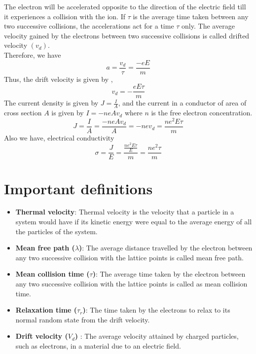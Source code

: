 \documentclass[15pt]{article}
\begin{document}
The electron will be accelerated opposite to the direction of the electric field till it experiences a collision with the ion. If $\tau$ is the average time taken between any two successive collisions, the accelerations act for a time $\tau$ only.
\newpage
The average velocity gained by the electrons between two successive collisions is called drifted velocity $(v_{d})$.
\\
Therefore, we have \begin{equation*}
    a = \frac{v_{d}}{\tau} = \frac{-eE}{m}
\end{equation*}
Thus, the drift velocity is given by ,
\begin{equation}
    v_{d} = -\frac{eE\tau}{m}
\end{equation}
The current density is given by $J = \frac{I}{A}$, and the current in a conductor of area of cross section $A$ is given by $I = -neAv_{d}$ where $n$ is the free electron concentration.
\begin{equation*}
    J =\frac{I}{A} = \frac{-neAv_{d}}{A} = -nev_{d} = \frac{ne^{2}E\tau}{m}
\end{equation*}
Also we have, electrical conductivity
\begin{equation}
    \sigma = \frac{J}{E} = \frac{\frac{ne^{2}E\tau}{E}}{m} = \frac{ne^{2}\tau}{m}
\end{equation}

\section*{Important definitions}

    \begin{itemize}
        \item \textbf{Thermal velocity}: Thermal velocity is the velocity that a particle in a system would have if its kinetic energy were equal to the average energy of all the particles of the system.
        \item \textbf{Mean free path ($\lambda$)}: The average distance travelled by the electron between any two successive collision with the lattice points is called mean free path.
        \item \textbf{Mean collision time ($\tau$)}: The average time taken by the electron between any two  successive collision with the lattice points is called as mean collision time.
        \item \textbf{Relaxation time ($\tau_{r}$)}: The time taken by the electrons to relax to its normal random state from the drift velocity. 
        \item \textbf{Drift velocity ($V_{d}$)} : The average velocity attained by charged particles, such as electrons, in a material due to an electric field. 
        
    \end{itemize}
\newpage
\end{document}
